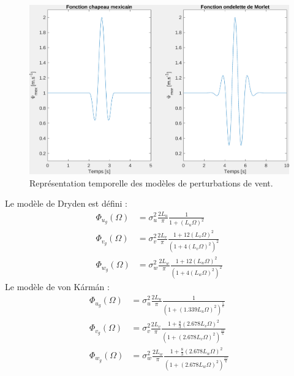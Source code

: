 \begin{figure}[ht!]
    \centerline{
    \includegraphics[trim=0cm 0cm 0cm 0cm,clip,width=0.9\columnwidth]{figures/mex_hat_morlet.png}}
    \caption{Représentation temporelle des modèles de perturbations de vent.}
    \label{fig:mexhat}
\end{figure}


Le modèle de Dryden est défini :
\begin{subequations}
    \begin{align}
        \Phi _{u_{g}}(\Omega )& =\sigma _{u}^{2}{\frac {2L_{u}}{\pi }}{\frac {1}{1+(L_{u}\Omega )^{2}}}\\
        \Phi _{v_{g}}(\Omega )& =\sigma _{v}^{2}{\frac {2L_{v}}{\pi }}{\frac {1+12(L_{v}\Omega )^{2}}{\left(1+4(L_{v}\Omega )^{2}\right)^{2}}}\\
        \Phi _{w_{g}}(\Omega )& =\sigma _{w}^{2}{\frac {2L_{w}}{\pi }}{\frac {1+12(L_{w}\Omega )^{2}}{\left(1+4(L_{w}\Omega )^{2}\right)^{2}}}
    \end{align}
\end{subequations}
Le modèle de von Kármán :
\begin{subequations}
    \begin{align}
        \Phi _{u_{g}}(\Omega )& =\sigma _{u}^{2}{\frac {2L_{u}}{\pi }}{\frac {1}{\left(1+(1.339L_{u}\Omega )^{2}\right)^{\frac {5}{6}}}}\\
        \Phi _{v_{g}}(\Omega )& =\sigma _{v}^{2}{\frac {2L_{v}}{\pi }}{\frac {1+{\frac {8}{3}}(2.678L_{v}\Omega )^{2}}{\left(1+(2.678L_{v}\Omega )^{2}\right)^{\frac {11}{6}}}}\\
        \Phi _{w_{g}}(\Omega )& =\sigma _{w}^{2}{\frac {2L_{w}}{\pi }}{\frac {1+{\frac {8}{3}}(2.678L_{w}\Omega )^{2}}{\left(1+(2.678L_{w}\Omega )^{2}\right)^{\frac {11}{6}}}}
    \end{align}
\end{subequations}


